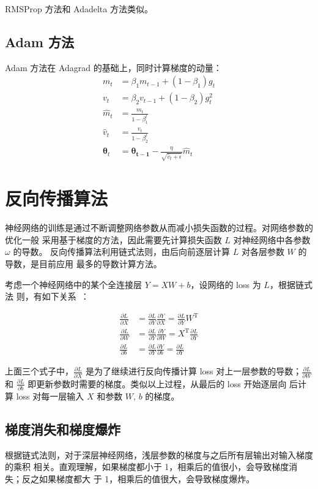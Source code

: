 RMSProp 方法和 Adadelta 方法类似。

\subsection{Adam 方法}
Adam 方法在 Adagrad 的基础上，同时计算梯度的动量：
\begin{align}
  m_t & = \beta_1 m_{t-1} + (1-\beta_1) g_t \\
  v_t & = \beta_2 v_{t-1} + (1-\beta_2) g_t^2 \\
  \hat{m}_t & = \frac{m_t}{1-\beta_1^t} \\
  \hat{v}_t & = \frac{v_t}{1-\beta_2^t} \\
  \boldsymbol{\theta}_{t} & = \boldsymbol{\theta_{t-1}} - \frac{\eta}{\sqrt{\hat{v}_t + \epsilon}}\hat{m}_t
\end{align}

\section{反向传播算法}
神经网络的训练是通过不断调整网络参数从而减小损失函数的过程。对网络参数的优化一般
采用基于梯度的方法，因此需要先计算损失函数 $L$ 对神经网络中各参数 $\omega$ 的导数。
反向传播算法利用链式法则，由后向前逐层计算 $L$ 对各层参数 $W$ 的导数，是目前应用
最多的导数计算方法。

考虑一个神经网络中的某个全连接层 $Y = XW + b$，设网络的 loss 为 $L$，根据链式法
则，有如下关系~：

\begin{align}
  \label{equ:bp-fc}
  \frac{\partial L}{\partial X} & = \frac{\partial L}{\partial Y} \frac{\partial Y}{\partial X} = \frac{\partial L}{\partial Y} W^{\mathrm{T}} \\
  \frac{\partial L}{\partial W} & = \frac{\partial L}{\partial Y} \frac{\partial Y}{\partial W} = X^{\mathrm{T}} \frac{\partial L}{\partial Y}\\
  \frac{\partial L}{\partial b} & = \frac{\partial L}{\partial Y} \frac{\partial Y}{\partial b} = \frac{\partial L}{\partial Y}
\end{align}

上面三个式子中，$\frac{\partial L}{\partial X}$ 是为了继续进行反向传播计算 loss
对上一层参数的导数；$\frac{\partial L}{\partial W}$ 和 $\frac{\partial
  L}{\partial b}$ 即更新参数时需要的梯度。类似以上过程，从最后的 loss 开始逐层向
后计算 loss 对每一层输入 $X$ 和参数 $W, \, b$ 的梯度。

\subsection{梯度消失和梯度爆炸}\label{subsec:gradient-vanish-explosion}
根据链式法则，对于深层神经网络，浅层参数的梯度与之后所有层输出对输入梯度的乘积
相关。直观理解，如果梯度都小于 1，相乘后的值很小，会导致梯度消失；反之如果梯度都大
于 1，相乘后的值很大，会导致梯度爆炸。


